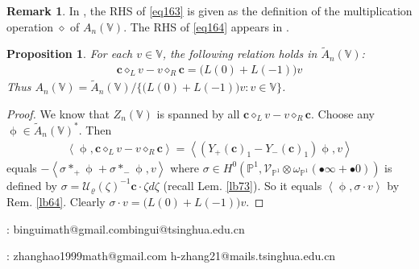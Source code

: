 \documentclass[11pt,b5paper,notitlepage]{article}
\theoremstyle{definition}
\newtheorem{rem}[df]{Remark}
\theoremstyle{plain}
\newtheorem{pp}[df]{Proposition}
\newcommand{\mc}{\mathcal}
\newcommand{\wtd}{\widetilde}
\newcommand{\scr}{\mathscr}
\newcommand{\blt}{\bullet}
\newcommand{\Vbb}{\mathbb V}
\newcommand{\Pbb}{\mathbb P}
\newcommand{\cbf}{\mathbf c}
\newcommand{\<}{\left\langle}
\renewcommand{\>}{\right\rangle}
\numberwithin{equation}{subsection}
\begin{document}
\begin{rem}
In \cite{DLM-Zhu}, the RHS of \eqref{eq163} is given as the definition of the multiplication operation $\diamond$ of $A_n(\Vbb)$. The RHS of \eqref{eq164} appears in \cite[Lem. 2.1-(ii)]{DLM-Zhu}.
\end{rem}



\begin{pp}
For each $v\in\Vbb$, the following relation holds in $\wtd A_n(\Vbb)$:
\begin{gather}
\cbf\diamond_L v-v\diamond_R\cbf=\big(L(0)+L(-1)\big)v
\end{gather}
Thus $A_n(\Vbb)=\wtd A_n(\Vbb)/\{\big(L(0)+L(-1)\big)v:v\in\Vbb\}$.
\end{pp}

\begin{proof}
We know that $Z_n(\Vbb)$ is spanned by all $\cbf\diamond_L v-v\diamond_R\cbf$. Choose any $\upphi\in\wtd A_n(\Vbb)^*$. Then
\begin{align*}
\<\upphi,\cbf\diamond_L v-v\diamond_R\cbf\>=\<(Y_+(\cbf)_1-Y_-(\cbf)_1)\upphi,v \>
\end{align*}
equals $-\<\sigma*_+\upphi+\sigma*_-\upphi,v\>$ where $\sigma\in H^0(\Pbb^1,\scr V_{\Pbb^1}\otimes\omega_{\Pbb^1}(\blt\infty+\blt 0))$ is defined by $\sigma=\mc U_\varrho(\zeta)^{-1}\cbf \cdot \zeta d\zeta$ (recall Lem. \ref{lb73}). So it equals $\<\upphi,\sigma\cdot v\>$ by Rem. \ref{lb64}. Clearly $\sigma\cdot v=\big(L(0)+L(-1)\big)v$.
\end{proof}








\printindex	
\footnotesize
	
    


: binguimath@gmail.com\qquad bingui@tsinghua.edu.cn\\


: zhanghao1999math@gmail.com \qquad h-zhang21@mails.tsinghua.edu.cn
\end{document}
